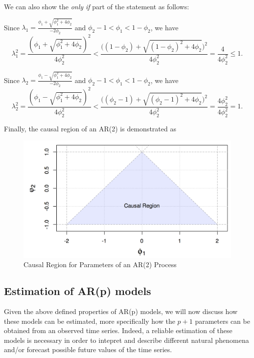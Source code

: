 \documentclass[]{book}
\theoremstyle{definition}
\theoremstyle{definition}
\theoremstyle{definition}
\theoremstyle{remark}
\begin{document}
We can also show the \emph{only if} part of the statement as follows:

Since
\(\lambda_1 = \frac{\phi_1 + \sqrt{\phi_1^2 + 4\phi_2}}{-2\phi_2}\) and
\(\phi_2 - 1 < \phi_1 < 1- \phi_2\), we have \[
\lambda_1^2 = \frac{(\phi_1 + \sqrt{\phi_1^2 + 4\phi_2})^2}{4\phi_2^2} < \frac{\Big( (1-\phi_2)+ \sqrt{(1-\phi_2)^2 + 4\phi_2} \Big)^2}{4\phi_2^2} = \frac{4}{4\phi_2^2} \leq 1. 
\]

Since
\(\lambda_2 = \frac{\phi_1 - \sqrt{\phi_1^2 + 4\phi_2}}{-2\phi_2}\) and
\(\phi_2 - 1 < \phi_1 < 1- \phi_2\), we have \[
\lambda_2^2 = \frac{(\phi_1 - \sqrt{\phi_1^2 + 4\phi_2})^2}{4\phi_2^2} < \frac{\Big( (\phi_2-1)+ \sqrt{(\phi_2-1)^2 + 4\phi_2} \Big)^2}{4\phi_2^2} = \frac{4\phi_2^2}{4\phi_2^2} = 1. 
\]

Finally, the causal region of an AR(2) is demonstrated as

\begin{figure}

{\centering \includegraphics{images/causal_AR2} 

}

\caption{Causal Region for Parameters of an AR(2) Process}\label{fig:correxample2}
\end{figure}

\subsection{Estimation of AR(p) models}\label{estimation-of-arp-models}

Given the above defined properties of AR(p) models, we will now discuss
how these models can be estimated, more specifically how the \(p+1\)
parameters can be obtained from an observed time series. Indeed, a
reliable estimation of these models is necessary in order to intepret
and describe different natural phenomena and/or forecast possible future
values of the time series.
\end{document}
